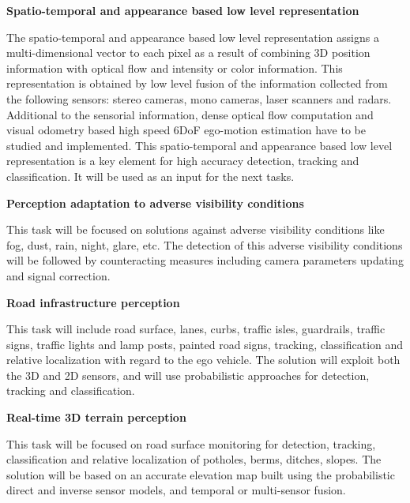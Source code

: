 {\begin{tasks}{\WPPerceptionNo}
\item  {\bf Spatio-temporal and appearance based low level representation}
  \taskpartners{\CLUJ}{\PRAGUE{}}
      \label{task:wpper:spatio}
  
The spatio-temporal and appearance based low level representation assigns a multi-dimensional vector to each pixel as a result of combining 3D position information with optical flow and intensity or color information. 
This representation is obtained by low level fusion of the information collected from the following sensors: stereo cameras, mono cameras, laser scanners and radars. Additional to the sensorial information, dense optical flow computation and visual odometry based high speed 6DoF ego-motion estimation have to be studied and implemented. This spatio-temporal and appearance based low level representation is a key element for high accuracy detection, tracking and classification. It will be used as an input for the next tasks.

\item  {\bf Perception adaptation to adverse visibility conditions}
  \taskpartner{\CLUJ{}}
      \label{task:wpper:perc}
  
This task will be focused on solutions against adverse visibility conditions like fog, dust, rain, night, glare, etc. The detection of this adverse visibility conditions will be followed by counteracting measures including camera parameters updating and signal correction.

\item  {\bf Road infrastructure perception}
  \taskpartner{\CLUJ}
      \label{task:wpper:roadi}
  
This task will include road surface, lanes, curbs, traffic isles, guardrails, traffic signs, traffic lights and lamp posts, painted road signs, tracking, classification and relative localization with regard to the ego vehicle. The solution will exploit both the 3D and 2D sensors, and will use probabilistic approaches for detection, tracking and classification.

\item  {\bf Real-time 3D terrain perception}
  \taskpartner{\PRAGUE}
      \label{task:wpper:roadm}
  
This task will be focused on road surface monitoring for detection, tracking, classification and relative localization of potholes, berms, ditches, slopes.
The solution will be based on an accurate elevation map built using the probabilistic direct and inverse sensor models, and temporal or multi-sensor fusion.


\end{tasks}}
